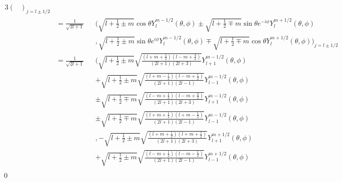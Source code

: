 \documentclass[uplatex,dvipdfmx,a4paper,11pt]{jlreq}
\makeatletter
\theoremstyle{definition}
\renewenvironment{proof}[1][\proofname]{\par
  \normalfont
  \topsep6\p@\@plus6\p@ \trivlist
  \item[\hskip\labelsep{\bfseries #1}\@addpunct{\bfseries}]\ignorespaces\quad\par
}{%
  \qed\endtrivlist\@endpefalse
}
\renewcommand\proofname{証明}
\numberwithin{equation}{section}
\makeatother
\begin{document}
\begin{proof}
\begin{alignat}{3}
\begin{pmatrix}
    \end{pmatrix}_{j = l\pm 1/2}                                                                                                                                                                                                             \\
                                                                       & = \frac{1}{\sqrt{2l + 1}}       &  & \Bigg(\sqrt{l + \frac{1}{2} \pm m}\cos\theta Y_l^{m - 1/2}(\theta, \phi) \pm\sqrt{l + \frac{1}{2} \mp m}\sin\theta e^{-i\phi}Y_l^{m + 1/2}(\theta, \phi)                 \\
                                                                       &                                 &  & , \sqrt{l + \frac{1}{2} \pm m}\sin\theta e^{i\phi}Y_l^{m - 1/2}(\theta, \phi) \mp\sqrt{l + \frac{1}{2} \mp m}\cos\theta Y_l^{m + 1/2}(\theta, \phi)\Bigg)_{j = l\pm 1/2} \\
                                                                       & = \frac{1}{\sqrt{2l + 1}}       &  & \Bigg(\sqrt{l + \frac{1}{2} \pm m}\sqrt{\frac{(l + m + \frac{1}{2})(l - m + \frac{3}{2})}{(2l + 1)(2l + 3)}}Y_{l+1}^{m-1/2}(\theta, \phi)                                \\
                                                                       &                                 &  & + \sqrt{l + \frac{1}{2} \pm m}\sqrt{\frac{(l + m - \frac{1}{2})(l - m + \frac{1}{2})}{(2l + 1)(2l - 1)}}Y_{l-1}^{m-1/2}(\theta, \phi)                                    \\
                                                                       &                                 &  & \pm\sqrt{l + \frac{1}{2} \mp m}\sqrt{\frac{(l - m + \frac{1}{2})(l - m + \frac{3}{2})}{(2l + 1)(2l + 3)}}Y_{l+1}^{m-1/2}(\theta, \phi)                                   \\
                                                                       &                                 &  & \pm\sqrt{l + \frac{1}{2} \mp m}\sqrt{\frac{(l + m + \frac{1}{2})(l + m - \frac{1}{2})}{(2l + 1)(2l - 1)}}Y_{l-1}^{m-1/2}(\theta, \phi)                                   \\
                                                                       &                                 &  & , -\sqrt{l + \frac{1}{2} \pm m}\sqrt{\frac{(l + m + \frac{1}{2})(l + m + \frac{3}{2})}{(2l + 1)(2l + 3)}}Y_{l+1}^{m+1/2}(\theta, \phi)                                   \\
                                                                       &                                 &  & + \sqrt{l + \frac{1}{2} \pm m}\sqrt{\frac{(l - m + \frac{1}{2})(l - m - \frac{1}{2})}{(2l + 1)(2l - 1)}}Y_{l-1}^{m+1/2}(\theta, \phi)                                    \\

\end{alignat}
\end{proof}
\end{document}
